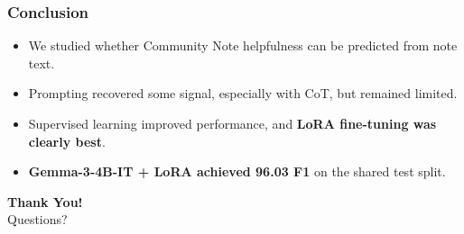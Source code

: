 \documentclass[11pt]{beamer}
\begin{document}
	\begin{frame}
		\frametitle{Conclusion}
		\begin{itemize}
			\item We studied whether Community Note helpfulness can be predicted from note text.
			\item Prompting recovered some signal, especially with CoT, but remained limited.
			\item Supervised learning improved performance, and \textbf{LoRA fine-tuning was clearly best}.
			\item \textbf{Gemma-3-4B-IT + LoRA achieved 96.03 F1} on the shared test split.
		\end{itemize}
		
		\vspace{0.5cm}
		\begin{center}
			\Large \textbf{Thank You!} \\
			\vspace{0.4cm}
			\normalsize Questions?
		\end{center}
	\end{frame}
	
\end{document}
